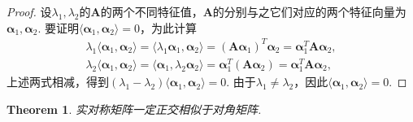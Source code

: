 \documentclass{article}
\newtheorem{theorem}{Theorem}[section]
\newcommand{\mbf}[1]{\bm{#1}}
\newcommand\inp[2]{\langle #1, #2 \rangle} %
\begin{document}
\begin{proof}
设$\lambda_1,\lambda_2$的$\mbf{A}$的两个不同特征值，$\mbf{A}$的分别与之它们对应的两个特征向量为$\mbf{\alpha}_1,\mbf{\alpha}_2$. 要证明$\inp{\mbf{\alpha}_1}{\mbf{\alpha}_2}=0$，为此计算
$$
\begin{array}{ll}
\lambda_1\inp{\mbf{\alpha}_1}{\mbf{\alpha}_2} = \inp{\lambda_1\mbf{\alpha}_1}{\mbf{\alpha}_2} = (\mbf{A}\mbf{\alpha}_1)^T\mbf{\alpha}_2 = \mbf{\alpha}_1^T\mbf{A}\mbf{\alpha}_2, \\
 \lambda_2\inp{\mbf{\alpha}_1}{\mbf{\alpha}_2} = \inp{\mbf{\alpha}_1}{\lambda_2\mbf{\alpha}_2}= \mbf{\alpha}_1^T(\mbf{A}\mbf{\alpha}_2) = \mbf{\alpha}_1^T\mbf{A}\mbf{\alpha}_2,
\end{array}
$$
上述两式相减，得到$(\lambda_1-\lambda_2)\inp{\mbf{\alpha}_1}{\mbf{\alpha}_2}=0$. 由于$\lambda_1 \neq \lambda_2$，因此$\inp{\mbf{\alpha}_1}{\mbf{\alpha}_2} = 0$.
\end{proof}

\begin{theorem}\label{symmetry: theorem2}
\rm 实对称矩阵一定正交相似于对角矩阵.
\end{theorem}
\end{document}
